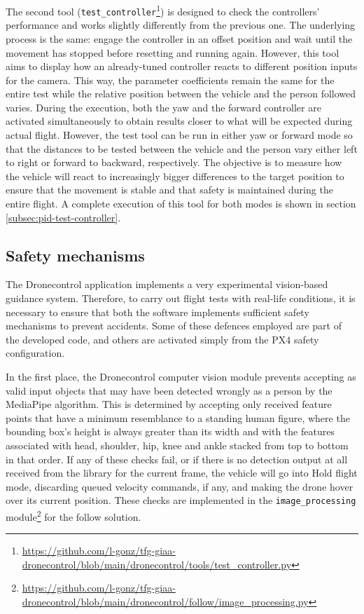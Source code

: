 The second tool (\texttt{test\_controller}\footnote{\url{https://github.com/l-gonz/tfg-giaa-dronecontrol/blob/main/dronecontrol/tools/test_controller.py}}) is designed to check the controllers' performance and works slightly differently from the previous one.
The underlying process is the same: engage the controller in an offset position and wait until the movement has stopped before resetting and running again.
However, this tool aims to display how an already-tuned controller reacts to different position inputs for the camera.
This way, the parameter coefficients remain the same for the entire test while the relative position between the vehicle and the person followed varies.
During the execution, both the yaw and the forward controller are activated simultaneously to obtain results closer to what will be expected during actual flight.
However, the test tool can be run in either yaw or forward mode so that the distances to be tested between the vehicle and the person vary either left to right or forward to backward, respectively.
The objective is to measure how the vehicle will react to increasingly bigger differences to the target position to ensure that the movement is stable and that safety is maintained during the entire flight.
A complete execution of this tool for both modes is shown in section \ref{subsec:pid-test-controller}.


\subsection{Safety mechanisms}
\label{subsec:safety}

The Dronecontrol application implements a very experimental vision-based guidance system.
Therefore, to carry out flight tests with real-life conditions, it is necessary to ensure that both the software implements sufficient safety mechanisms to prevent accidents.
Some of these defences employed are part of the developed code, and others are activated simply from the PX4 safety configuration.

In the first place, the Dronecontrol computer vision module prevents accepting as valid input objects that may have been detected wrongly as a person by the MediaPipe algorithm.
This is determined by accepting only received feature points that have a minimum resemblance to a standing human figure, where the bounding box's height is always greater than its width and with the features associated with head, shoulder, hip, knee and ankle stacked from top to bottom in that order.
If any of these checks fail, or if there is no detection output at all received from the library for the current frame, the vehicle will go into Hold flight mode, discarding queued velocity commands, if any, and making the drone hover over its current position.
These checks are implemented in the \texttt{image\_processing} module\footnote{\url{https://github.com/l-gonz/tfg-giaa-dronecontrol/blob/main/dronecontrol/follow/image_processing.py}} for the follow solution.


